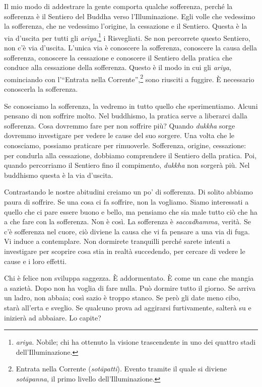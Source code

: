 Il mio modo di addestrare la gente comporta qualche sofferenza, perché
la sofferenza è il Sentiero del Buddha verso l'Illuminazione. Egli
volle che vedessimo la sofferenza, che ne vedessimo l'origine, la
cessazione e il Sentiero. Questa è la via d'uscita per tutti gli
\emph{ariya},\footnote{\emph{ariya.} Nobile; chi ha ottenuto la visione
  trascendente in uno dei quattro stadi dell'Illuminazione.} i
Risvegliati. Se non percorrete questo Sentiero, non c'è via d'uscita.
L'unica via è conoscere la sofferenza, conoscere la causa della
sofferenza, conoscere la cessazione e conoscere il Sentiero della
pratica che conduce alla cessazione della sofferenza. Questo è il modo
in cui gli \emph{ariya}, cominciando con l'``Entrata nella
Corrente'',\footnote{Entrata nella Corrente (\emph{sotāpatti}). Evento
  tramite il quale si diviene \emph{sotāpanna}, il primo livello
  dell'Illuminazione.} sono riusciti a fuggire. È necessario conoscerla
la sofferenza.

Se conosciamo la sofferenza, la vedremo in tutto quello che
sperimentiamo. Alcuni pensano di non soffrire molto. Nel buddhismo, la
pratica serve a liberarci dalla sofferenza. Cosa dovremmo fare per non
soffrire più? Quando \emph{dukkha} sorge dovremmo investigare per vedere
le cause del suo sorgere. Una volta che le conosciamo, possiamo
praticare per rimuoverle. Sofferenza, origine, cessazione: per condurla
alla cessazione, dobbiamo comprendere il Sentiero della pratica. Poi,
quando percorriamo il Sentiero fino il compimento, \emph{dukkha} non
sorgerà più. Nel buddhismo questa è la via d'uscita.

Contrastando le nostre abitudini creiamo un po' di sofferenza. Di solito
abbiamo paura di soffrire. Se una cosa ci fa soffrire, non la vogliamo.
Siamo interessati a quello che ci pare essere buono e bello, ma pensiamo
che sia male tutto ciò che ha a che fare con la sofferenza. Non è così.
La sofferenza è \emph{saccadhamma}, verità. Se c'è sofferenza nel cuore,
ciò diviene la causa che vi fa pensare a una via di fuga. Vi induce a
contemplare. Non dormirete tranquilli perché sarete intenti a
investigare per scoprire cosa stia in realtà succedendo, per cercare di
vedere le cause e i loro effetti.

Chi è felice non sviluppa saggezza. È addormentato. È come un cane che
mangia a sazietà. Dopo non ha voglia di fare nulla. Può dormire tutto il
giorno. Se arriva un ladro, non abbaia; così sazio è troppo stanco. Se
però gli date meno cibo, starà all'erta e sveglio. Se qualcuno prova ad
aggirarsi furtivamente, salterà su e inizierà ad abbaiare. Lo capite?

